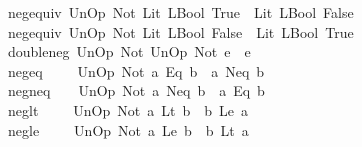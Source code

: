 \begin{isabellebody}
\ \ {\isacharbar}{\kern0pt}\ neg{\isacharunderscore}{\kern0pt}equiv{}{\isacharcolon}{\kern0pt}\ {\isachardoublequoteopen}UnOp\ Not\ {\isacharparenleft}{\kern0pt}Lit\ {\isacharparenleft}{\kern0pt}LBool\ True{\isacharparenright}{\kern0pt}{\isacharparenright}{\kern0pt}\ {\isasymsim}\ {\isacharparenleft}{\kern0pt}Lit\ {\isacharparenleft}{\kern0pt}LBool\ False{\isacharparenright}{\kern0pt}{\isacharparenright}{\kern0pt}{\isachardoublequoteclose}\isanewline
\ \ {\isacharbar}{\kern0pt}\ neg{\isacharunderscore}{\kern0pt}equiv{}{\isacharcolon}{\kern0pt}\ {\isachardoublequoteopen}UnOp\ Not\ {\isacharparenleft}{\kern0pt}Lit\ {\isacharparenleft}{\kern0pt}LBool\ False{\isacharparenright}{\kern0pt}{\isacharparenright}{\kern0pt}\ {\isasymsim}\ {\isacharparenleft}{\kern0pt}Lit\ {\isacharparenleft}{\kern0pt}LBool\ True{\isacharparenright}{\kern0pt}{\isacharparenright}{\kern0pt}{\isachardoublequoteclose}\isanewline
\ \ {\isacharbar}{\kern0pt}\ double{\isacharunderscore}{\kern0pt}neg{\isacharcolon}{\kern0pt}\ {\isachardoublequoteopen}UnOp\ Not\ {\isacharparenleft}{\kern0pt}UnOp\ Not\ e{}{\isacharparenright}{\kern0pt}\ {\isasymsim}\ e{}{\isachardoublequoteclose}\isanewline
\ \ {\isacharbar}{\kern0pt}\ neg{\isacharunderscore}{\kern0pt}eq{\isacharcolon}{\kern0pt}\ \ \ \ \ {\isachardoublequoteopen}UnOp\ Not\ {\isacharparenleft}{\kern0pt}a\ {\isasymguillemotleft}Eq{\isasymguillemotright}\ b{\isacharparenright}{\kern0pt}\ {\isasymsim}\ {\isacharparenleft}{\kern0pt}a\ {\isasymguillemotleft}Neq{\isasymguillemotright}\ b{\isacharparenright}{\kern0pt}{\isachardoublequoteclose}\isanewline
\ \ {\isacharbar}{\kern0pt}\ neg{\isacharunderscore}{\kern0pt}neq{\isacharcolon}{\kern0pt}\ \ \ \ {\isachardoublequoteopen}UnOp\ Not\ {\isacharparenleft}{\kern0pt}a\ {\isasymguillemotleft}Neq{\isasymguillemotright}\ b{\isacharparenright}{\kern0pt}\ {\isasymsim}\ {\isacharparenleft}{\kern0pt}a\ {\isasymguillemotleft}Eq{\isasymguillemotright}\ b{\isacharparenright}{\kern0pt}{\isachardoublequoteclose}\isanewline
\ \ {\isacharbar}{\kern0pt}\ neg{\isacharunderscore}{\kern0pt}lt{\isacharcolon}{\kern0pt}\ \ \ \ \ {\isachardoublequoteopen}UnOp\ Not\ {\isacharparenleft}{\kern0pt}a\ {\isasymguillemotleft}Lt{\isasymguillemotright}\ b{\isacharparenright}{\kern0pt}\ {\isasymsim}\ {\isacharparenleft}{\kern0pt}b\ {\isasymguillemotleft}Le{\isasymguillemotright}\ a{\isacharparenright}{\kern0pt}{\isachardoublequoteclose}\isanewline
\ \ {\isacharbar}{\kern0pt}\ neg{\isacharunderscore}{\kern0pt}le{\isacharcolon}{\kern0pt}\ \ \ \ \ {\isachardoublequoteopen}UnOp\ Not\ {\isacharparenleft}{\kern0pt}a\ {\isasymguillemotleft}Le{\isasymguillemotright}\ b{\isacharparenright}{\kern0pt}\ {\isasymsim}\ {\isacharparenleft}{\kern0pt}b\ {\isasymguillemotleft}Lt{\isasymguillemotright}\ a{\isacharparenright}{\kern0pt}{\isachardoublequoteclose}\isanewline

\end{isabellebody}
